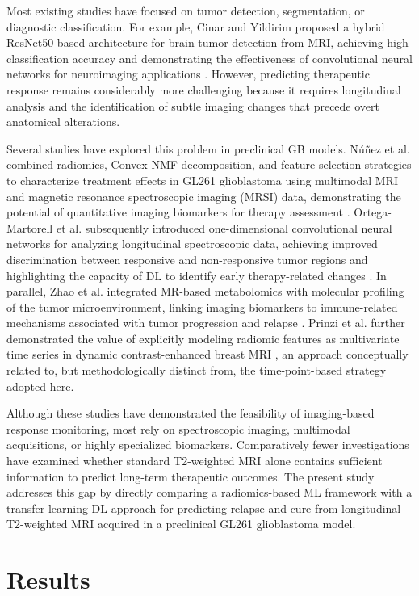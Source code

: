 \documentclass{article}
\begin{document}
Most existing studies have focused on tumor detection, segmentation, or diagnostic classification. For example, Cinar and Yildirim proposed a hybrid ResNet50-based architecture for brain tumor detection from MRI, achieving high classification accuracy and demonstrating the effectiveness of convolutional neural networks for neuroimaging applications \cite{Cinar2020}. However, predicting therapeutic response remains considerably more challenging because it requires longitudinal analysis and the identification of subtle imaging changes that precede overt anatomical alterations.

Several studies have explored this problem in preclinical GB models. Núñez et al. combined radiomics, Convex-NMF decomposition, and feature-selection strategies to characterize treatment effects in GL261 glioblastoma using multimodal MRI and magnetic resonance spectroscopic imaging (MRSI) data, demonstrating the potential of quantitative imaging biomarkers for therapy assessment \cite{interpretingLuisMiguel}. Ortega-Martorell et al. subsequently introduced one-dimensional convolutional neural networks for analyzing longitudinal spectroscopic data, achieving improved discrimination between responsive and non-responsive tumor regions and highlighting the capacity of DL to identify early therapy-related changes \cite{Ortega-Martorell2023}. In parallel, Zhao et al. integrated MR-based metabolomics with molecular profiling of the tumor microenvironment, linking imaging biomarkers to immune-related mechanisms associated with tumor progression and relapse \cite{Zhao2023}. Prinzi et al. further demonstrated the value of explicitly modeling radiomic features as multivariate time series in dynamic contrast-enhanced breast MRI \cite{Prinzi2024}, an approach conceptually related to, but methodologically distinct from, the time-point-based strategy adopted here.

Although these studies have demonstrated the feasibility of imaging-based response monitoring, most rely on spectroscopic imaging, multimodal acquisitions, or highly specialized biomarkers. Comparatively fewer investigations have examined whether standard T2-weighted MRI alone contains sufficient information to predict long-term therapeutic outcomes. The present study addresses this gap by directly comparing a radiomics-based ML framework with a transfer-learning DL approach for predicting relapse and cure from longitudinal T2-weighted MRI acquired in a preclinical GL261 glioblastoma model.

\section{Results}
\end{document}
